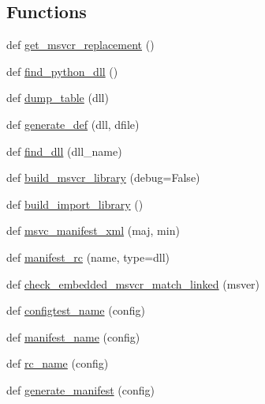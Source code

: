 \subsection*{Functions}
\begin{DoxyCompactItemize}
\item 
def \hyperlink{namespacenumpy_1_1distutils_1_1mingw32ccompiler_af57d27d51a84e4c6a8eef8d5aa211936}{get\+\_\+msvcr\+\_\+replacement} ()
\item 
def \hyperlink{namespacenumpy_1_1distutils_1_1mingw32ccompiler_aa62ae771888dd234f5f18f8c8abc90f8}{find\+\_\+python\+\_\+dll} ()
\item 
def \hyperlink{namespacenumpy_1_1distutils_1_1mingw32ccompiler_aa99f39b5a9ffeaf72cc391b6e4a488f1}{dump\+\_\+table} (dll)
\item 
def \hyperlink{namespacenumpy_1_1distutils_1_1mingw32ccompiler_a3ddd00e2fbe0eceeaa6fa2921a6feba0}{generate\+\_\+def} (dll, dfile)
\item 
def \hyperlink{namespacenumpy_1_1distutils_1_1mingw32ccompiler_a26297fc8d2989c8a254553e4febc0a00}{find\+\_\+dll} (dll\+\_\+name)
\item 
def \hyperlink{namespacenumpy_1_1distutils_1_1mingw32ccompiler_af9368639fb40611434ff1378fd956f64}{build\+\_\+msvcr\+\_\+library} (debug=False)
\item 
def \hyperlink{namespacenumpy_1_1distutils_1_1mingw32ccompiler_a8ab45cb917a0b238041a8a685b55a976}{build\+\_\+import\+\_\+library} ()
\item 
def \hyperlink{namespacenumpy_1_1distutils_1_1mingw32ccompiler_a9ef6602a55c37af69cb12ada38d7ea4d}{msvc\+\_\+manifest\+\_\+xml} (maj, min)
\item 
def \hyperlink{namespacenumpy_1_1distutils_1_1mingw32ccompiler_a1e91d43ea39f49203d9061599485412b}{manifest\+\_\+rc} (name, type=\textquotesingle{}dll\textquotesingle{})
\item 
def \hyperlink{namespacenumpy_1_1distutils_1_1mingw32ccompiler_ad936f3e62ac8e5773e084c2e2aeca585}{check\+\_\+embedded\+\_\+msvcr\+\_\+match\+\_\+linked} (msver)
\item 
def \hyperlink{namespacenumpy_1_1distutils_1_1mingw32ccompiler_ae5b5002a3c06682a88e6b8600ea72532}{configtest\+\_\+name} (config)
\item 
def \hyperlink{namespacenumpy_1_1distutils_1_1mingw32ccompiler_a1b6c11ad1fba33d8828f5ae9a2f32cde}{manifest\+\_\+name} (config)
\item 
def \hyperlink{namespacenumpy_1_1distutils_1_1mingw32ccompiler_a326f0cfaa76bbbe6f161606aba7a435b}{rc\+\_\+name} (config)
\item 
def \hyperlink{namespacenumpy_1_1distutils_1_1mingw32ccompiler_a3b50b5351a791ceee52c6a52b9f76c5b}{generate\+\_\+manifest} (config)
\end{DoxyCompactItemize}
